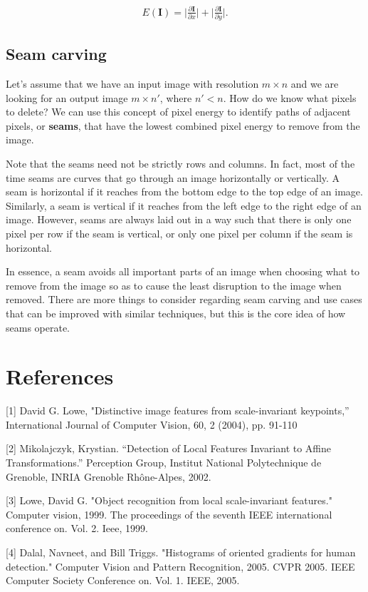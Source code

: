 \documentclass{article}
\begin{document}
\begin{align}
	E(\textbf{I}) = \bigg| \frac{\partial \textbf{I}}{\partial x} \bigg| + \bigg| \frac{\partial \textbf{I}}{\partial y} \bigg| \text{.} \nonumber
\end{align}

\subsection{Seam carving}

Let's assume that we have an input image with resolution $m \times n$ and we are looking for an output image $m \times n'$, where $n' < n$. How do we know what pixels to delete? We can use this concept of pixel energy to identify paths of adjacent pixels, or \textbf{seams}, that have the lowest combined pixel energy to remove from the image.

Note that the seams need not be strictly rows and columns. In fact, most of the time seams are curves that go through an image horizontally or vertically. A seam is horizontal if it reaches from the bottom edge to the top edge of an image. Similarly, a seam is vertical if it reaches from the left edge to the right edge of an image. However, seams are always laid out in a way such that there is only one pixel per row if the seam is vertical, or only one pixel per column if the seam is horizontal.

In essence, a seam avoids all important parts of an image when choosing what to remove from the image so as to cause the least disruption to the image when removed. There are more things to consider regarding seam carving and use cases that can be improved with similar techniques, but this is the core idea of how seams operate.

\section*{References}
[1] David G. Lowe, "Distinctive image features from scale-invariant keypoints,”  International Journal of Computer Vision, 60, 2 (2004), pp. 91-110

[2] Mikolajczyk, Krystian. “Detection of Local Features Invariant to Affine Transformations.” Perception Group, Institut National Polytechnique de Grenoble, INRIA Grenoble Rhône-Alpes, 2002.

[3] Lowe, David G. "Object recognition from local scale-invariant features." Computer vision, 1999. The proceedings of the seventh IEEE international conference on. Vol. 2. Ieee, 1999.

[4] Dalal, Navneet, and Bill Triggs. "Histograms of oriented gradients for human detection." Computer Vision and Pattern Recognition, 2005. CVPR 2005. IEEE Computer Society Conference on. Vol. 1. IEEE, 2005.

% 
% 
\end{document}
